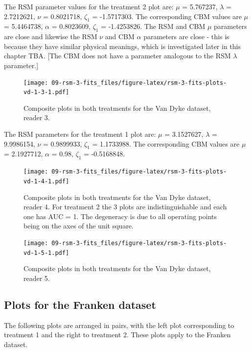 \documentclass[
]{book}
\begin{document}
The RSM parameter values for the treatment 2 plot are: \(\mu\) = 5.767237, \(\lambda\) = 2.7212621, \(\nu\) = 0.8021718, \(\zeta_1\) = -1.5717303. The corresponding CBM values are \(\mu\) = 5.4464738, \(\alpha\) = 0.8023609, \(\zeta_1\) = -1.4253826. The RSM and CBM \(\mu\) parameters are close and likewise the RSM \(\nu\) and CBM \(\alpha\) parameters are close - this is because they have similar physical meanings, which is investigated later in this chapter TBA. {[}The CBM does not have a parameter analogous to the RSM \(\lambda\) parameter.{]}

\begin{figure}
\centering
\texttt{[image: 09-rsm-3-fits\_files/figure-latex/rsm-3-fits-plots-vd-1-3-1.pdf]}
\caption{\label{fig:rsm-3-fits-plots-vd-1-3}Composite plots in both treatments for the Van Dyke dataset, reader 3.}
\end{figure}

The RSM parameters for the treatment 1 plot are: \(\mu\) = 3.1527627, \(\lambda\) = 9.9986154, \(\nu\) = 0.9899933, \(\zeta_1\) = 1.1733988. The corresponding CBM values are \(\mu\) = 2.1927712, \(\alpha\) = 0.98, \(\zeta_1\) = -0.5168848.

\begin{figure}
\centering
\texttt{[image: 09-rsm-3-fits\_files/figure-latex/rsm-3-fits-plots-vd-1-4-1.pdf]}
\caption{\label{fig:rsm-3-fits-plots-vd-1-4}Composite plots in both treatments for the Van Dyke dataset, reader 4. For treatment 2 the 3 plots are indistinguishable and each one has AUC = 1. The degeneracy is due to all operating points being on the axes of the unit square.}
\end{figure}

\begin{figure}
\centering
\texttt{[image: 09-rsm-3-fits\_files/figure-latex/rsm-3-fits-plots-vd-1-5-1.pdf]}
\caption{\label{fig:rsm-3-fits-plots-vd-1-5}Composite plots in both treatments for the Van Dyke dataset, reader 5.}
\end{figure}

\hypertarget{rsm-3-fits-representative-plots-franken}{%
\subsection{Plots for the Franken dataset}\label{rsm-3-fits-representative-plots-franken}}

The following plots are arranged in pairs, with the left plot corresponding to treatment 1 and the right to treatment 2. These plots apply to the Franken dataset.
\end{document}
